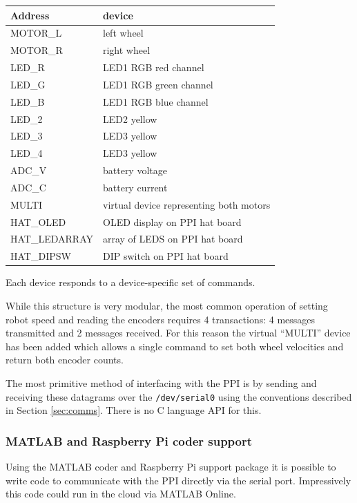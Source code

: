 \documentclass[11pt,fleqn]{article}
\begin{document}
\begin{centering}
\begin{tabular}{|l|l|}\hline
Address & device \\ \hline\hline
MOTOR\_L & left wheel \\
MOTOR\_R &right wheel \\
LED\_R &  LED1 RGB red channel \\
LED\_G&  LED1 RGB green channel \\
LED\_B&  LED1 RGB blue channel \\
LED\_2 & LED2 yellow \\
LED\_3& LED3 yellow \\
LED\_4& LED3 yellow \\
ADC\_V & battery voltage \\
ADC\_C & battery current \\ 
MULTI & virtual device representing both motors \\ \hline
HAT\_OLED & OLED display on PPI hat board\\
HAT\_LEDARRAY & array of LEDS on PPI hat board \\
HAT\_DIPSW & DIP switch on PPI hat board \\ \hline
\end{tabular}
\end{centering}

Each device responds to a device-specific set of commands.

While this structure is very modular, the most common operation of setting robot speed and reading the encoders requires 4 
transactions: 4 messages transmitted and 2 messages received. For this reason the virtual ``MULTI'' device has been added which
allows a single command to set both wheel velocities and return both encoder counts.

The most primitive method of interfacing with the PPI is by sending and receiving these datagrams over the \texttt{/dev/serial0} using the conventions described in Section \ref{sec:comms}.  There is no C language API for this. 

\subsubsection{MATLAB and Raspberry Pi coder support}
Using the MATLAB coder and Raspberry Pi support package it is possible to write code to communicate with the PPI directly via
the serial port.  Impressively this code could run in the cloud via MATLAB Online.
\end{document}
